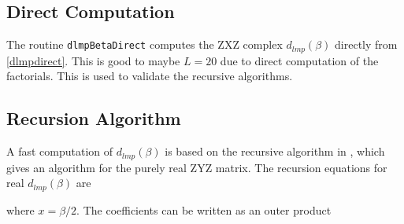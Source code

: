 \subsection{Direct Computation}

The routine \texttt{dlmpBetaDirect} computes the ZXZ complex $d_{lmp}(\beta)$ directly from \eqref{dlmpdirect}. This is good to maybe $L = 20$ due to direct computation of the factorials. This is used to validate the recursive algorithms.

{\footnotesize
{}
}

\subsection{Recursion Algorithm}

A fast computation of $d_{lmp}(\beta)$ is based on the recursive algorithm in \cite{gimbutas2009fast}, which gives an algorithm for the purely real ZYZ matrix. The recursion equations for real $d_{lmp}(\beta)$ are 
 
\noindent where $x = \beta/2$. The coefficients can be written as an outer product 




